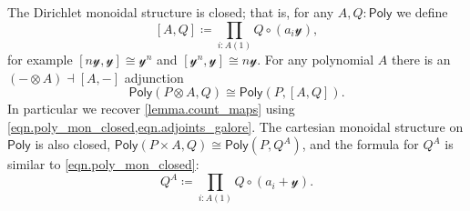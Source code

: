 \documentclass[11pt, article, one side]{memoir}
\theoremstyle{theorem}
\newtheorem{proposition}[section]{Proposition}
\theoremstyle{definition}
\theoremstyle{remark}
\newcommand{\Cat}[1]{\mathsf{#1}}%
\newcommand{\yon}{\mathcal{y}}
\newcommand{\poly}{\Cat{Poly}}
\begin{document}
The Dirichlet monoidal structure is closed; that is, for any $A,Q:\poly$ we define
\begin{equation}\label{eqn.poly_mon_closed}
[A,Q]\coloneqq\prod_{i:A(1)}Q\circ(a_i\yon),
\end{equation}
for example $[n\yon,\yon]\cong \yon^n$ and $[\yon^n,\yon]\cong n\yon$. For any polynomial $A$ there is an $(-\otimes A)\dashv[A,-]$ adjunction 
\begin{equation}\label{eqn.hom_tensor}
	\poly(P\otimes A,Q)\cong\poly(P,[A,Q]).
\end{equation}
%
%
%
In particular we recover \cref{lemma.count_maps} using  \cref{eqn.poly_mon_closed,eqn.adjoints_galore}. The cartesian monoidal structure on $\poly$ is also closed, $\poly(P\times A,Q)\cong\poly(P,Q^A)$, and the formula for $Q^A$ is similar to \cref{eqn.poly_mon_closed}:
\[
  Q^A\coloneqq\prod_{i:A(1)}Q\circ (a_i+\yon).
\]
\end{document}
